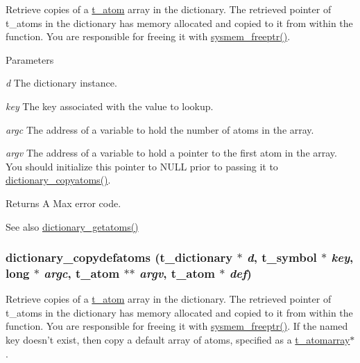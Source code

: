 Retrieve copies of a \hyperlink{structt__atom}{t\_\-atom} array in the dictionary. The retrieved pointer of t\_\-atoms in the dictionary has memory allocated and copied to it from within the function. You are responsible for freeing it with \hyperlink{group__memory_ga200c82639e547869db1f3887d17102d3}{sysmem\_\-freeptr()}.


\begin{DoxyParams}{Parameters}
\item[{\em d}]The dictionary instance. \item[{\em key}]The key associated with the value to lookup. \item[{\em argc}]The address of a variable to hold the number of atoms in the array. \item[{\em argv}]The address of a variable to hold a pointer to the first atom in the array. You should initialize this pointer to NULL prior to passing it to \hyperlink{group__dictionary_ga15aff654a0d97b363e7676ff7e9709fd}{dictionary\_\-copyatoms()}. \end{DoxyParams}
\begin{DoxyReturn}{Returns}
A Max error code.
\end{DoxyReturn}
\begin{DoxySeeAlso}{See also}
\hyperlink{group__dictionary_gacda8208be5d424b81387258098bdbaa1}{dictionary\_\-getatoms()} 
\end{DoxySeeAlso}
\hypertarget{group__dictionary_gaa886af0aad9db9bc6b08314b9b5672f9}{
\subsubsection[{dictionary\_\-copydefatoms}]{ dictionary\_\-copydefatoms ({\bf t\_\-dictionary} $\ast$ {\em d}, \/  {\bf t\_\-symbol} $\ast$ {\em key}, \/  long $\ast$ {\em argc}, \/  {\bf t\_\-atom} $\ast$$\ast$ {\em argv}, \/  {\bf t\_\-atom} $\ast$ {\em def})}}
\label{group__dictionary_gaa886af0aad9db9bc6b08314b9b5672f9}


Retrieve copies of a \hyperlink{structt__atom}{t\_\-atom} array in the dictionary. The retrieved pointer of t\_\-atoms in the dictionary has memory allocated and copied to it from within the function. You are responsible for freeing it with \hyperlink{group__memory_ga200c82639e547869db1f3887d17102d3}{sysmem\_\-freeptr()}. If the named key doesn't exist, then copy a default array of atoms, specified as a \hyperlink{structt__atomarray}{t\_\-atomarray}$\ast$.


